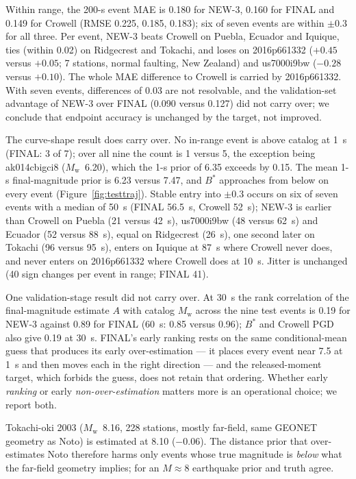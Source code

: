 \documentclass[12pt,letterpaper]{article}
\newcommand{\Mw}{M_{\mathrm{w}}}
\begin{document}
Within range, the 200-s event MAE is 0.180 for NEW-3, 0.160 for FINAL and 0.149 for Crowell (RMSE 0.225, 0.185, 0.183); six of seven events are within $\pm0.3$ for all three. Per event, NEW-3 beats Crowell on Puebla, Ecuador and Iquique, ties (within 0.02) on Ridgecrest and Tokachi, and loses on 2016p661332 ($+0.45$ versus $+0.05$; 7 stations, normal faulting, New Zealand) and us7000i9bw ($-0.28$ versus $+0.10$). The whole MAE difference to Crowell is carried by 2016p661332. With seven events, differences of 0.03 are not resolvable, and the validation-set advantage of NEW-3 over FINAL (0.090 versus 0.127) did not carry over; we conclude that endpoint accuracy is unchanged by the target, not improved.

The curve-shape result does carry over. No in-range event is above catalog at 1~s (FINAL: 3 of 7); over all nine the count is 1 versus 5, the exception being ak014cbigci8 ($\Mw$~6.20), which the 1-s prior of 6.35 exceeds by 0.15. The mean 1-s final-magnitude prior is 6.23 versus 7.47, and $B^*$ approaches from below on every event (Figure~\ref{fig:testtraj}). Stable entry into $\pm0.3$ occurs on six of seven events with a median of 50~s (FINAL 56.5~s, Crowell 52~s); NEW-3 is earlier than Crowell on Puebla (21 versus 42~s), us7000i9bw (48 versus 62~s) and Ecuador (52 versus 88~s), equal on Ridgecrest (26~s), one second later on Tokachi (96 versus 95~s), enters on Iquique at 87~s where Crowell never does, and never enters on 2016p661332 where Crowell does at 10~s. Jitter is unchanged (40 sign changes per event in range; FINAL 41).

One validation-stage result did not carry over. At 30~s the rank correlation of the final-magnitude estimate $A$ with catalog $\Mw$ across the nine test events is 0.19 for NEW-3 against 0.89 for FINAL (60~s: 0.85 versus 0.96); $B^*$ and Crowell PGD also give 0.19 at 30~s. FINAL's early ranking rests on the same conditional-mean guess that produces its early over-estimation --- it places every event near 7.5 at 1~s and then moves each in the right direction --- and the released-moment target, which forbids the guess, does not retain that ordering. Whether early \emph{ranking} or early \emph{non-over-estimation} matters more is an operational choice; we report both.

Tokachi-oki 2003 ($\Mw$~8.16, 228 stations, mostly far-field, same GEONET geometry as Noto) is estimated at 8.10 ($-0.06$). The distance prior that over-estimates Noto therefore harms only events whose true magnitude is \emph{below} what the far-field geometry implies; for an $M\approx8$ earthquake prior and truth agree.
\end{document}
